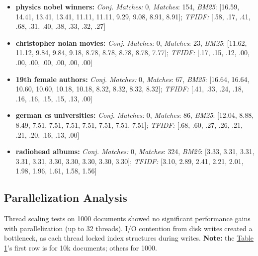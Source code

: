 \begin{itemize}
  \item \textbf{physics nobel winners:} \textit{Conj. Matches:} 0, \textit{Matches}: 154, \textit{BM25}: [16.59, 14.41, 13.41, 13.41, 11.11, 11.11, 9.29, 9.08, 8.91, 8.91]; \textit{TFIDF:} [.58, .17, .41, .68, .31, .40, .38, .33, .32, .27]
  \item \textbf{christopher nolan movies:} \textit{Conj. Matches:} 0, \textit{Matches}: 23, \textit{BM25}: [11.62, 11.12, 9.84, 9.84, 9.18, 8.78, 8.78, 8.78, 8.78, 7.77]; \textit{TFIDF:} [.17, .15, .12, .00, .00, .00, .00, .00, .00, .00]
  \item \textbf{19th female authors:} \textit{Conj. Matches:} 0, \textit{Matches}: 67, \textit{BM25}: [16.64, 16.64, 10.60, 10.60, 10.18, 10.18, 8.32, 8.32, 8.32, 8.32]; \textit{TFIDF:} [.41, .33, .24, .18, .16, .16, .15, .15, .13, .00]
  \item \textbf{german cs universities:} \textit{Conj. Matches:} 0, \textit{Matches}: 86, \textit{BM25}: [12.04, 8.88, 8.49, 7.51, 7.51, 7.51, 7.51, 7.51, 7.51, 7.51]; \textit{TFIDF:} [.68, .60, .27, .26, .21, .21, .20, .16, .13, .00]
  \item \textbf{radiohead albums:} \textit{Conj. Matches:} 0, \textit{Matches}: 324, \textit{BM25}: [3.33, 3.31, 3.31, 3.31, 3.31, 3.30, 3.30, 3.30, 3.30, 3.30]; \textit{TFIDF:} [3.10, 2.89, 2.41, 2.21, 2.01, 1.98, 1.96, 1.61, 1.58, 1.56]
\end{itemize}

\subsection{Parallelization Analysis} \label{subsec:parallelization}


Thread scaling tests on 1000 documents showed no significant performance gains with parallelization (up to 32 threads). I/O contention from disk writes created a bottleneck, as each thread locked index structures during writes. \textbf{Note:} the \hyperref[tab:threads]{Table 1}'s first row is for 10k documents; others for 1000.

